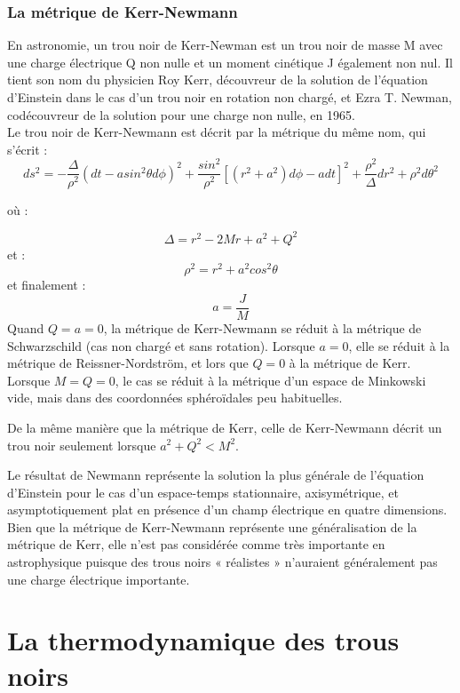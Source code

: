\documentclass[12pt,  a4paper, openright]{report} %
\begin{document}
\subsection{La métrique de Kerr-Newmann}
En astronomie, un trou noir de Kerr-Newman est un trou noir de masse M avec une charge électrique Q non nulle et un moment cinétique J également non nul. Il tient son nom du physicien Roy Kerr, découvreur de la solution de l'équation d'Einstein dans le cas d'un trou noir en rotation non chargé, et Ezra T. Newman, codécouvreur de la solution pour une charge non nulle, en 1965.\\
Le trou noir de Kerr-Newmann est décrit par la métrique du même nom, qui s'écrit :
\begin{equation}
ds^{2}=-\dfrac{\Delta}{\rho^{2}}(dt-asin^{2}\theta d\phi)^{2}+\dfrac{sin^{2}}{\rho^{2}}[(r^{2}+a^{2})d\phi-adt]^{2}+\dfrac{\rho^{2}}{\Delta}dr^{2}+\rho^{2}d\theta^{2}
\end{equation}

où :

$$\Delta=r^{2}-2Mr+a^{2}+Q^{2}$$
et :
$$\rho^{2}=r^{2}+a^{2}cos^{2}\theta$$ 
et finalement :
$$a=\dfrac{J}{M}$$
Quand $Q=a=0$, la métrique de Kerr-Newmann se réduit à la métrique de Schwarzschild (cas non chargé et sans rotation). Lorsque $a=0$, elle se réduit à la métrique de Reissner-Nordström, et lors que $ Q=0$ à la métrique de Kerr. Lorsque $ M=Q=0$, le cas se réduit à la métrique d'un espace de Minkowski vide, mais dans des coordonnées sphéroïdales peu habituelles.

De la même manière que la métrique de Kerr, celle de Kerr-Newmann décrit un trou noir seulement lorsque $a^{2}+Q^{2}< M^{2}$.	
	
Le résultat de Newmann représente la solution la plus générale de l'équation d'Einstein pour le cas d'un espace-temps stationnaire, axisymétrique, et asymptotiquement plat en présence d'un champ électrique en quatre dimensions. Bien que la métrique de Kerr-Newmann représente une généralisation de la métrique de Kerr, elle n'est pas considérée comme très importante en astrophysique puisque des trous noirs « réalistes » n'auraient généralement pas une charge électrique importante.
\chapter{La thermodynamique des trous noirs}
\end{document}
